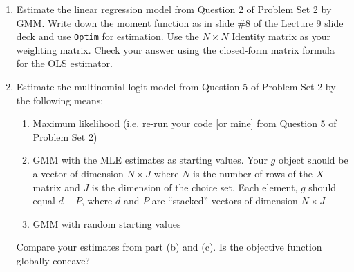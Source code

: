 \documentclass[12pt,english]{article}
\begin{document}
\begin{enumerate}
\item Estimate the linear regression model from Question 2 of Problem Set 2 by GMM. Write down the moment function as in slide \#8 of the Lecture 9 slide deck and use \texttt{Optim} for estimation. Use the $N\times N$ Identity matrix as your weighting matrix. Check your answer using the closed-form matrix formula for the OLS estimator.

\item Estimate the multinomial logit model from Question 5 of Problem Set 2 by the following means:
    \begin{enumerate}
    \item Maximum likelihood (i.e. re-run your code [or mine] from Question 5 of Problem Set 2)
    \item GMM with the MLE estimates as starting values. Your $g$ object should be a vector of dimension $N\times J$ where $N$ is the number of rows of the $X$ matrix and $J$ is the dimension of the choice set. Each element, $g$ should equal $d - P$, where $d$ and $P$ are ``stacked'' vectors of dimension $N\times J$
    \item GMM with random starting values
    \end{enumerate}
    Compare your estimates from part (b) and (c). Is the objective function globally concave?


\end{enumerate}
\end{document}
